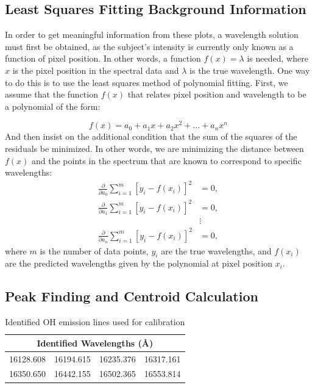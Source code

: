 \documentclass{article}
\begin{document}
\subsection{Least Squares Fitting Background Information}

In order to get meaningful information from these plots, a wavelength solution must first be obtained, as the subject's intensity is currently only known 
as a function of pixel position. In other words, a function $f(x) = \lambda$ is needed, where $x$ is the pixel position in the spectral data and $\lambda$ is the true wavelength. One way 
to do this is to use the least squares method of polynomial fitting. First, we assume that the function $f(x)$ that relates pixel position and wavelength to be a polynomial of the form:

\begin{equation}
  \label{eq:1}
  f(x) = a_0 + a_1x + a_2x^2 + \ldots + a_nx^n
\end{equation}
And then insist on the additional condition that the sum of the squares of the residuals be minimized. In other words, we are minimizing the distance between $f(x)$ and the points in the spectrum that are known to correspond to specific wavelengths:
\begin{align*}
\frac{\partial}{\partial a_0} \sum_{i=1}^{m} [y_i - f(x_i)]^2 &= 0, \\
\frac{\partial}{\partial a_1} \sum_{i=1}^{m} [y_i - f(x_i)]^2 &= 0, \\
&\vdots \\
\frac{\partial}{\partial a_n} \sum_{i=1}^{m} [y_i - f(x_i)]^2 &= 0,
\end{align*}
\noindent
where $m$ is the number of data points, $y_i$ are the true wavelengths, and $f(x_i)$ are the predicted wavelengths given by the polynomial at pixel position $x_i$. 

\subsection{Peak Finding and Centroid Calculation}

\begin{table}[h]
  \centering
  \begin{tabular}{|c|c|c|c|}
  \hline
  \multicolumn{4}{|c|}{Identified Wavelengths (\AA)} \\
  \hline
  16128.608 & 16194.615 & 16235.376 & 16317.161 \\
  \hline
  16350.650 & 16442.155 & 16502.365 & 16553.814 \\
  \hline
  \end{tabular}
  \caption{Identified OH emission lines used for calibration}
  \label{tab:oh_lines_cal}
\end{table}
\end{document}
